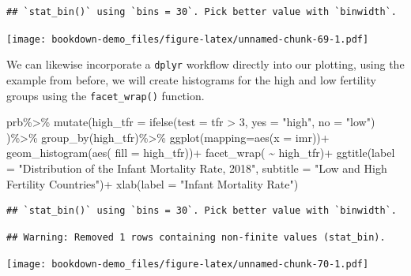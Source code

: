 \documentclass[
]{article}
\newenvironment{Shaded}{\begin{snugshade}}{\end{snugshade}}
\newcommand{\AttributeTok}[1]{\textcolor[rgb]{0.77,0.63,0.00}{#1}}
\newcommand{\DecValTok}[1]{\textcolor[rgb]{0.00,0.00,0.81}{#1}}
\newcommand{\FunctionTok}[1]{\textcolor[rgb]{0.00,0.00,0.00}{#1}}
\newcommand{\NormalTok}[1]{#1}
\newcommand{\SpecialCharTok}[1]{\textcolor[rgb]{0.00,0.00,0.00}{#1}}
\newcommand{\StringTok}[1]{\textcolor[rgb]{0.31,0.60,0.02}{#1}}
\begin{document}
\begin{verbatim}
## `stat_bin()` using `bins = 30`. Pick better value with `binwidth`.
\end{verbatim}

\texttt{[image: bookdown-demo\_files/figure-latex/unnamed-chunk-69-1.pdf]}

We can likewise incorporate a \texttt{dplyr} workflow directly into our
plotting, using the example from before, we will create histograms for
the high and low fertility groups using the \texttt{facet\_wrap()} function.

\begin{Shaded}
\begin{Highlighting}[]
\NormalTok{prb}\SpecialCharTok{\%\textgreater{}\%}
  \FunctionTok{mutate}\NormalTok{(}\AttributeTok{high\_tfr =} \FunctionTok{ifelse}\NormalTok{(}\AttributeTok{test =}\NormalTok{ tfr }\SpecialCharTok{\textgreater{}} \DecValTok{3}\NormalTok{,}
                           \AttributeTok{yes =} \StringTok{"high"}\NormalTok{,}
                           \AttributeTok{no =} \StringTok{"low"}\NormalTok{) )}\SpecialCharTok{\%\textgreater{}\%}
  \FunctionTok{group\_by}\NormalTok{(high\_tfr)}\SpecialCharTok{\%\textgreater{}\%}
  \FunctionTok{ggplot}\NormalTok{(}\AttributeTok{mapping=}\FunctionTok{aes}\NormalTok{(}\AttributeTok{x =}\NormalTok{ imr))}\SpecialCharTok{+}
  \FunctionTok{geom\_histogram}\NormalTok{(}\FunctionTok{aes}\NormalTok{( }\AttributeTok{fill =}\NormalTok{ high\_tfr))}\SpecialCharTok{+}
  \FunctionTok{facet\_wrap}\NormalTok{( }\SpecialCharTok{\textasciitilde{}}\NormalTok{ high\_tfr)}\SpecialCharTok{+}
  \FunctionTok{ggtitle}\NormalTok{(}\AttributeTok{label =} \StringTok{"Distribution of the Infant Mortality Rate, 2018"}\NormalTok{,}
          \AttributeTok{subtitle =} \StringTok{"Low and High Fertility Countries"}\NormalTok{)}\SpecialCharTok{+}
  \FunctionTok{xlab}\NormalTok{(}\AttributeTok{label =} \StringTok{"Infant Mortality Rate"}\NormalTok{)}
\end{Highlighting}
\end{Shaded}

\begin{verbatim}
## `stat_bin()` using `bins = 30`. Pick better value with `binwidth`.
\end{verbatim}

\begin{verbatim}
## Warning: Removed 1 rows containing non-finite values (stat_bin).
\end{verbatim}

\texttt{[image: bookdown-demo\_files/figure-latex/unnamed-chunk-70-1.pdf]}
\end{document}
